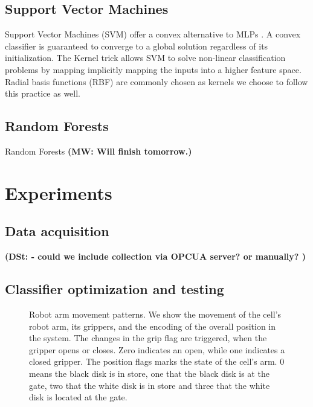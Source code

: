 \documentclass[5p,times,procedia]{elsarticle}
\newcommand{\MW}[1]{{\color{teal} {\bf (MW: #1)}}}
\newcommand{\DSt}[1]{{\color{orange} {\bf (DSt: #1)}}}
\begin{document}
\subsection{Support Vector Machines}
Support Vector Machines (SVM) offer a convex alternative to MLPs \cite{Suykens2002least}.
A convex classifier is guaranteed to converge to a global solution regardless 
of its initialization. 
The Kernel trick allows SVM to solve non-linear classification problems \cite{Suykens2002least} by mapping implicitly mapping the inputs into a higher feature space. Radial basis functions (RBF) are commonly chosen as kernels
\cite{Suykens2002least} we choose to follow this practice as well.

\subsection{Random Forests}
Random Forests \cite{breiman2001random} \MW{Will finish tomorrow.}


\section{Experiments}

\subsection{Data acquisition}
\DSt{
- could we include collection via OPCUA server? or manually? 
}



\subsection{Classifier optimization and testing}\label{sec:ml_exp}

\begin{figure}
       
       \caption{Robot arm movement patterns. We show the movement of the 
                cell's robot arm, its grippers, and the encoding of the overall
                position in the system. The changes in the grip flag are triggered,
                when the gripper opens or closes. Zero indicates an open, while
                one indicates a closed gripper. The position flags marks the state
                of the cell's arm. 0 means the black disk is in store,
                one that the black disk is at the gate, two that the white disk
                is in store and three that the white disk is located at the gate.
             }
\label{fig:robot_pos_cell}
\end{figure}
\end{document}
